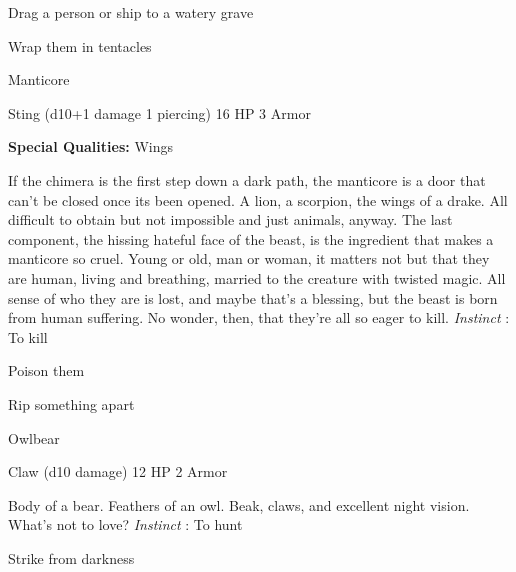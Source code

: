 \startitemize[1,packed]

\item Drag a person or ship to a watery grave

 
\item Wrap them in tentacles


\stopitemize
 
\startMonsterName
Manticore	 
\stopMonsterName
 

Sting (d10+1 damage 1 piercing)	16 HP	3 Armor

 


 
\startMonsterQualities
{\bf Special Qualities:}  Wings
\stopMonsterQualities
 
\startMonsterDescription
If the chimera is the first step down a dark path, the manticore is a door that can’t be closed once its been opened. A lion, a scorpion, the wings of a drake. All difficult to obtain but not impossible and just animals, anyway. The last component, the hissing hateful face of the beast, is the ingredient that makes a manticore so cruel. Young or old, man or woman, it matters not but that they are human, living and breathing, married to the creature with twisted magic. All sense of who they are is lost, and maybe that’s a blessing, but the beast is born from human suffering. No wonder, then, that they’re all so eager to kill. {\em Instinct} : To kill
\stopMonsterDescription
 
\startitemize[1,packed]

\item Poison them

 
\item Rip something apart


\stopitemize
 
\startMonsterName
Owlbear	 
\stopMonsterName
 

Claw (d10 damage)	12 HP	2 Armor

 


 
\startMonsterDescription
Body of a bear. Feathers of an owl. Beak, claws, and excellent night vision. What’s not to love? {\em Instinct} : To hunt
\stopMonsterDescription
 
\startitemize[1,packed]

\item Strike from darkness


\stopitemize
 
